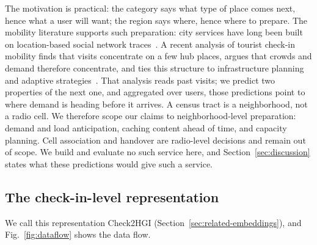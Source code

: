The motivation is practical: the category says what type of place comes next, hence what a user will want; the region says where, hence where to prepare. The mobility literature supports such preparation: city services have long been built on location-based social network traces~\cite{silva2019urbancomputing}. A recent analysis of tourist check-in
mobility finds that visits concentrate on a few hub places, argues that crowds and demand therefore concentrate, and ties this structure to
infrastructure planning and adaptive strategies~\cite{moura2025mobilityaware}.
That analysis reads past visits; we predict two properties of
the next one, and aggregated over users, those predictions point to where
demand is heading before it arrives. A census
tract is a neighborhood, not a radio cell. We therefore scope our claims to
neighborhood-level preparation: demand and load anticipation, caching content
ahead of time, and capacity planning. Cell association and handover are
radio-level decisions and remain out of scope. We build and evaluate no such
service here, and Section~\ref{sec:discussion} states what these predictions
would give such a service.


\subsection{The check-in-level representation}
\label{sec:method-rep}

We call this representation Check2HGI (Section~\ref{sec:related-embeddings}), and Fig.~\ref{fig:dataflow} shows the data flow.


